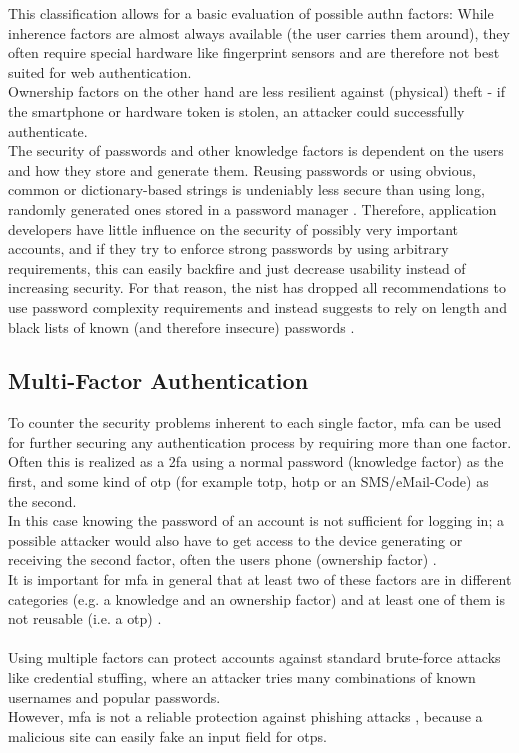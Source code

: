 \noindent This classification allows for a basic evaluation of possible \ac{authn} factors: While inherence factors are almost always available (the user carries them around), they often require special hardware like fingerprint sensors and are therefore not best suited for web authentication.\\
Ownership factors on the other hand are less resilient against (physical) theft - if the smartphone or hardware token is stolen, an attacker could successfully authenticate.\\
The security of passwords and other knowledge factors is dependent on the users and how they store and generate them. Reusing passwords or using obvious, common or dictionary-based strings is undeniably less secure than using long, randomly generated ones stored in a password manager \cite{lyastani2018,hunt2011,hunt2018c}. Therefore, application developers have little influence on the security of possibly very important accounts, and if they try to enforce strong passwords by using arbitrary requirements, this can easily backfire \cite{hunt2017} and just decrease usability instead of increasing security. For that reason, the \ac{nist} has dropped all recommendations to use password complexity requirements and instead suggests to rely on length and black lists of known (and therefore insecure) passwords \cite{nist}.

\subsection{Multi-Factor Authentication}
\label{subsec:mfa}

To counter the security problems inherent to each single factor, \ac{mfa} can be used for further securing any authentication process by requiring more than one factor. Often this is realized as a \ac{2fa} using a normal password (knowledge factor) as the first, and some kind of \ac{otp} (for example \ac{totp}, \ac{hotp} or an SMS/eMail-Code) as the second.\\
In this case knowing the password of an account is not sufficient for logging in; a possible attacker would also have to get access to the device generating or receiving the second factor, often the users phone (ownership factor) \cite{statista_2fa,hunt2018a}.\\
It is important for \ac{mfa} in general that at least two of these factors are in different categories (e.g. a knowledge and an ownership factor) and at least one of them is not reusable (i.e. a \ac{otp}) \cite{nist,turner2016}.\\
\\
Using multiple factors can protect accounts against standard brute-force attacks like credential stuffing, where an attacker tries many combinations of known usernames and popular passwords.\\
However, \ac{mfa} is not a reliable protection against phishing attacks \cite{lyastani2020}, because a malicious site can easily fake an input field for \acp{otp}.


